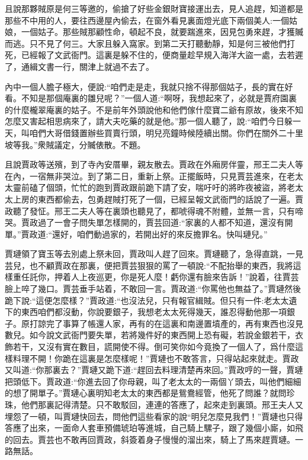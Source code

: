 \begin{parag}
    且說那夥賊原是何三等邀的，偷搶了好些金銀財寶接運出去，見人追趕，知道都是那些不中用的人，要往西邊屋內偷去，在窗外看見裏面燈光底下兩個美人:一個姑娘，一個姑子。那些賊那顧性命，頓起不良，就要踹進來，因見包勇來趕，才獲贓而逃。只不見了何三。大家且躲入窩家。到第二天打聽動靜，知是何三被他們打死，已經報了文武衙門。這裏是躲不住的，便商量趁早規入海洋大盜一處，去若遲了，通緝文書一行，關津上就過不去了。
\end{parag}


\begin{parag}
    內中一個人膽子極大，便說:“咱們走是走，我就只捨不得那個姑子，長的實在好看。不知是那個庵裏的雛兒呢？”一個人道:“啊呀，我想起來了，必就是賈府園裏的什麼櫳翠庵裏的姑子。不是前年外頭說他和他們傢什麼寶二爺有原故，後來不知怎麼又害起相思病來了，請大夫吃藥的就是他。”那一個人聽了，說:“咱們今日躲一天，叫咱們大哥借錢置辦些買賣行頭，明兒亮鐘時候陸續出關。你們在關外二十里坡等我。”衆賊議定，分贓俵散。不題。
\end{parag}


\begin{parag}
    且說賈政等送殯，到了寺內安厝畢，親友散去。賈政在外廂房伴靈，邢王二夫人等在內，一宿無非哭泣。到了第二日，重新上祭。正擺飯時，只見賈芸進來，在老太太靈前磕了個頭，忙忙的跑到賈政跟前跪下請了安，喘吁吁的將昨夜被盜，將老太太上房的東西都偷去，包勇趕賊打死了一個，已經呈報文武衙門的話說了一遍。賈政聽了發怔。邢王二夫人等在裏頭也聽見了，都唬得魂不附體，並無一言，只有啼哭。賈政過了一會子問失單怎樣開的，賈芸回道:“家裏的人都不知道，還沒有開單。”賈政道:“還好，咱們動過家的，若開出好的來反擔罪名。快叫璉兒。”
\end{parag}


\begin{parag}
    賈璉領了寶玉等去別處上祭未回，賈政叫人趕了回來。賈璉聽了，急得直跳，一見芸兒，也不顧賈政在那裏，便把賈芸狠狠的罵了一頓說:“不配抬舉的東西，我將這樣重任託你，押着人上夜巡更，你是死人麼！虧你還有臉來告訴！”說着，往賈芸臉上啐了幾口。賈芸垂手站着，不敢回一言。賈政道:“你罵他也無益了。”賈璉然後跪下說:“這便怎麼樣？”賈政道:“也沒法兒，只有報官緝賊。但只有一件:老太太遺下的東西咱們都沒動，你說要銀子，我想老太太死得幾天，誰忍得動他那一項銀子。原打諒完了事算了帳還人家，再有的在這裏和南邊置墳產的，再有東西也沒見數兒。如今說文武衙門要失單，若將幾件好的東西開上恐有礙，若說金銀若干，衣飾若干，又沒有實在數目，謊開使不得。倒可笑你如今竟換了一個人了，爲什麼這樣料理不開！你跪在這裏是怎麼樣呢！”賈璉也不敢答言，只得站起來就走。賈政又叫道:“你那裏去？”賈璉又跪下道:“趕回去料理清楚再來回。”賈政哼的一聲，賈璉把頭低下。賈政道:“你進去回了你母親，叫了老太太的一兩個丫頭去，叫他們細細的想了開單子。”賈璉心裏明知老太太的東西都是鴛鴦經管，他死了問誰？就問珍珠，他們那裏記得清楚。只不敢駁回，連連的答應了，起來走到裏頭。邢王夫人又埋怨了一頓，叫賈璉快回去，問他們這些看家的說“明兒怎麼見我們！”賈璉也只得答應了出來，一面命人套車預備琥珀等進城，自己騎上騾子，跟了幾個小廝，如飛的回去。賈芸也不敢再回賈政，斜簽着身子慢慢的溜出來，騎上了馬來趕賈璉。一路無話。
\end{parag}


